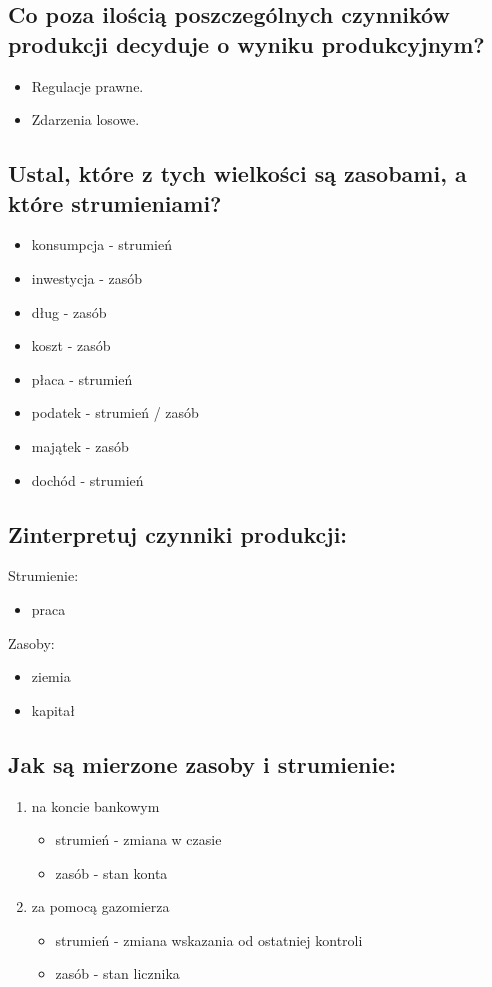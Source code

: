 \documentclass[a4paper,12pt]{article}
\begin{document}
\subsection{Co poza ilością poszczególnych czynników produkcji decyduje o wyniku produkcyjnym?}

\begin{itemize}
	\item Regulacje prawne.
	\item Zdarzenia losowe.
\end{itemize}

\subsection{Ustal, które z tych wielkości są zasobami, a które strumieniami?}

\begin{itemize}
	\item konsumpcja - strumień
	\item inwestycja - zasób 
	\item dług - zasób
	\item koszt - zasób 
	\item płaca - strumień
	\item podatek - strumień / zasób
	\item majątek - zasób
	\item dochód - strumień
\end{itemize}

\subsection{Zinterpretuj czynniki produkcji:}

Strumienie:
\begin{itemize}
	\item praca
\end{itemize}
Zasoby:
\begin{itemize}
	\item ziemia
	\item kapitał
\end{itemize}

\subsection{Jak są mierzone zasoby i strumienie:}
\begin{enumerate}
	\item na koncie bankowym
	\begin{itemize}
		\item strumień - zmiana w czasie
		\item zasób - stan konta
	\end{itemize}
	\item za pomocą gazomierza
	\begin{itemize}
		\item strumień - zmiana wskazania od ostatniej kontroli
		\item zasób - stan licznika
	\end{itemize}
\end{enumerate}
\end{document}
